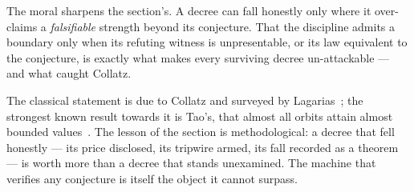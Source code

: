 The moral sharpens the section's. A decree can fall honestly only where it over-claims a \emph{falsifiable} strength beyond
its conjecture. That the discipline admits a boundary only when its refuting witness is unpresentable, or its law equivalent
to the conjecture, is exactly what makes every surviving decree un-attackable --- and what caught Collatz.

The classical statement is due to Collatz and surveyed by Lagarias~\cite{lagarias1985,lagarias2010}; the strongest known result towards it is Tao's, that almost all orbits attain almost bounded values~\cite{tao2022}.
The lesson of the section is methodological: a decree that fell honestly --- its price disclosed, its
tripwire armed, its fall recorded as a theorem --- is worth more than a decree that stands unexamined.
The machine that verifies any conjecture is itself the object it cannot surpass.
